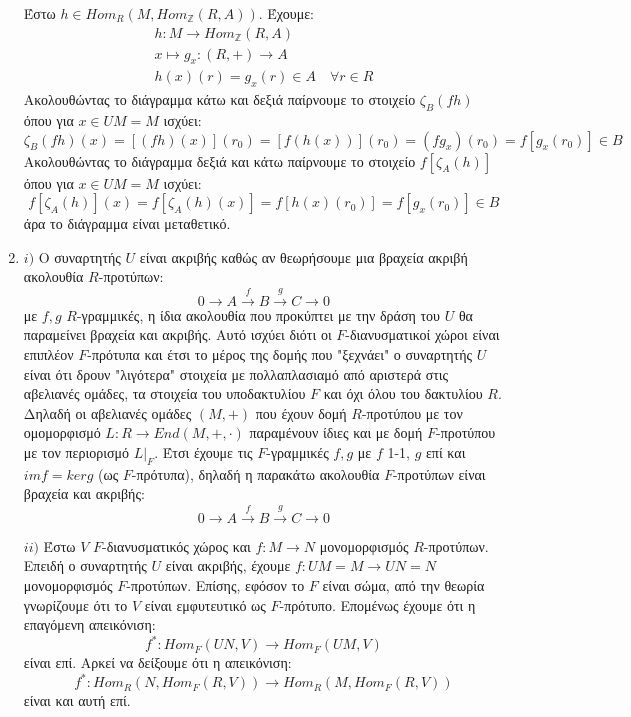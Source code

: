 \documentclass{article}
\begin{document}
\begin{enumerate}
	Έστω $h \in {Hom_R (M , Hom_{\mathbb{Z}} (R,A) )}$. Έχουμε:
	\begin{gather*}
		h:M\longrightarrow Hom_{\mathbb{Z}} (R,A) \\
		x \mapsto g_x : (R,+) \longrightarrow A \\
		h(x)(r) = g_x (r) \in A \quad\forall r \in R
	\end{gather*}
	Ακολουθώντας το διάγραμμα κάτω και δεξιά παίρνουμε το στοιχείο $\zeta_B (fh)$ όπου για $x \in UM = M$ ισχύει:
	$$\zeta_B (fh)(x) = [(fh)(x)](r_0) = [f(h(x))] (r_0) = (fg_x)(r_0)= f[g_x(r_0)] \in B$$
	Aκολουθώντας το διάγραμμα δεξιά και κάτω παίρνουμε το στοιχείο $f[\zeta_A (h)]$ όπου για $x \in UM = M$ ισχύει:
	$$f[\zeta_A (h)] (x) = f[\zeta_A (h)(x)] = f[h(x)(r_0)] = f[g_x (r_0)] \in B$$
	άρα το διάγραμμα είναι μεταθετικό.
	$ $\newline

\item $i)$ Ο συναρτητής $U$ είναι ακριβής καθώς αν θεωρήσουμε μια βραχεία ακριβή ακολουθία $R$-προτύπων:
	$$0\rightarrow A \xrightarrow{f} B \xrightarrow{g} C \rightarrow 0$$
	με $f,g$ $R$-γραμμικές, η ίδια ακολουθία που προκύπτει με την δράση του $U$ θα παραμείνει βραχεία και ακριβής. Αυτό ισχύει διότι οι $F$-διανυσματικοί χώροι είναι επιπλέον $F$-πρότυπα και έτσι το μέρος της δομής που "ξεχνάει" ο συναρτητής $U$ είναι ότι δρουν "λιγότερα" στοιχεία με πολλαπλασιαμό από αριστερά στις αβελιανές ομάδες, τα στοιχεία του υποδακτυλίου $F$ και όχι όλου του δακτυλίου $R$. Δηλαδή οι αβελιανές ομάδες $(Μ,+)$ που έχουν δομή $R$-προτύπου με τον ομομορφισμό $L: R \rightarrow End(M,+,\cdot)$ παραμένουν ίδιες και με δομή $F$-προτύπου με τον περιορισμό $L|_F$. Έτσι έχουμε τις $F$-γραμμικές $f,g$ με $f$ 1-1, $g$ επί και $imf=kerg$ (ως $F$-πρότυπα), δηλαδή η παρακάτω ακολουθία $F$-προτύπων είναι βραχεία και ακριβής:
	$$0\rightarrow A \xrightarrow{f} B \xrightarrow{g} C \rightarrow 0$$
	$ $\newline

	$ii)$ Έστω $V$ $F$-διανυσματικός χώρος και $f: M \rightarrow N$ μονομορφισμός $R$-προτύπων. Επειδή ο συναρτητής $U$ είναι ακριβής, έχουμε $f: UM=M \rightarrow UN=N$ μονομορφισμός $F$-προτύπων. Επίσης, εφόσον το $F$ είναι σώμα, από την θεωρία γνωρίζουμε ότι το $V$ είναι εμφυτευτικό ως $F$-πρότυπο. Eπομένως έχουμε ότι η επαγόμενη απεικόνιση:
	$$f^* : Hom_F (UN,V) \rightarrow Hom_F (UM,V)$$
	είναι επί.
	Αρκεί να δείξουμε ότι η απεικόνιση:
	$$f^* : Hom_R(N, Hom_F (R,V)) \rightarrow Hom_R (M, Hom_F (R,V))$$
	είναι και αυτή επί.


\end{enumerate}
\end{document}
